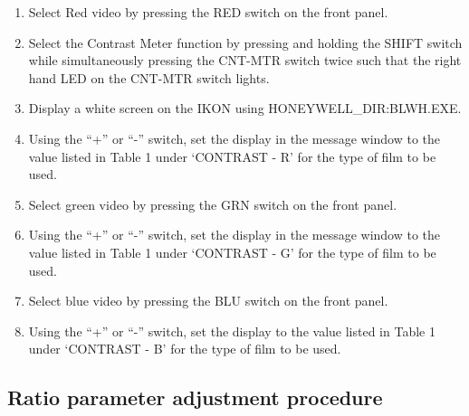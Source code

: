 \begin{enumerate}

\item Select Red video by pressing the RED switch on the front panel.

\item Select the Contrast Meter function by pressing and holding the 
SHIFT switch while simultaneously pressing the CNT-MTR switch twice
such that the right hand LED on the CNT-MTR switch lights.

\item Display a white screen on the IKON using HONEYWELL\_DIR:BLWH.EXE.

\item Using the ``+'' or ``-'' switch, set the display in the message window to
the value listed in Table 1 under `CONTRAST - R' for the type
of film to be used.

\item Select green video by pressing the GRN switch on the front panel.

\item Using the ``+'' or ``-'' switch, set the display in the message window
to the value listed in Table 1 under `CONTRAST - G' for the
type of film to be used.

\item Select blue video by pressing the BLU switch on the front panel.

\item Using the ``+'' or ``-'' switch, set the display to the value listed in
Table 1 under `CONTRAST - B' for the type of film to be
used.

\end {enumerate}

\subsection {\bf Ratio parameter adjustment procedure}

